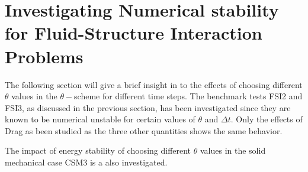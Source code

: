 \section{Investigating Numerical stability for Fluid-Structure Interaction Problems}
The following section will give a brief insight in to the effects of choosing different $\theta$ values in the $\theta-$scheme for different time steps. 
The benchmark tests FSI2 and FSI3, as discussed in the previous section, has been investigated since they are known to be numerical unstable for certain values of $\theta$ and $\Delta t$. Only the effects of Drag as been studied as the three other quantities shows the same behavior.  \newline 

The impact of energy stability of choosing different $\theta$ values in the solid mechanical case CSM3 is a also investigated.

